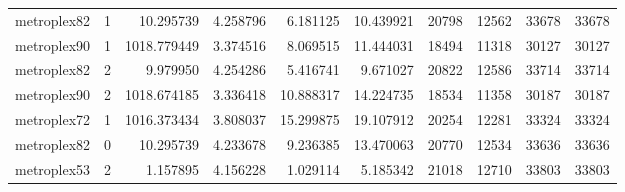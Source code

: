 \begin{longtable}{|l|r|r|r|r|r|r|r|r|r|}
metroplex82 & 1 & 10.295739 & 4.258796 & 6.181125 & 10.439921 & 20798 & 12562 & 33678 & 33678 \\
metroplex90 & 1 & 1018.779449 & 3.374516 & 8.069515 & 11.444031 & 18494 & 11318 & 30127 & 30127 \\
metroplex82 & 2 & 9.979950 & 4.254286 & 5.416741 & 9.671027 & 20822 & 12586 & 33714 & 33714 \\
metroplex90 & 2 & 1018.674185 & 3.336418 & 10.888317 & 14.224735 & 18534 & 11358 & 30187 & 30187 \\
metroplex72 & 1 & 1016.373434 & 3.808037 & 15.299875 & 19.107912 & 20254 & 12281 & 33324 & 33324 \\
metroplex82 & 0 & 10.295739 & 4.233678 & 9.236385 & 13.470063 & 20770 & 12534 & 33636 & 33636 \\
metroplex53 & 2 & 1.157895 & 4.156228 & 1.029114 & 5.185342 & 21018 & 12710 & 33803 & 33803 \\
\end{longtable}
